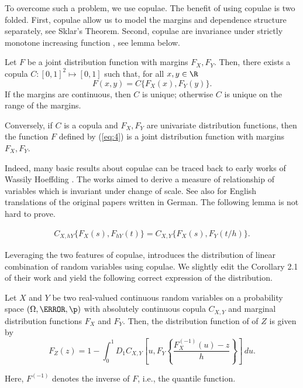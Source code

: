 To overcome such a problem, we use copulae.
The benefit of using copulae is two folded.
First, copulae allow us to model the margins and dependence structure separately, see Sklar's Theorem.
Second, copulae are invariance under strictly monotone increasing function \citep{schweizer1981nonparametric}, see lemma below.

\begin{theorem}
  Let $F$ be a joint distribution function with margins $F_X,
  F_Y$. Then, there exists a copula $C:[0,1]^2 \mapsto [0,1]$ such
  that, for all $x,y\in \R$
  \begin{equation}
    \label{eq:4}
    F(x,y)=C\{F_X(x), F_Y(y)\}.
  \end{equation}
  If the margins are continuous, then $C$ is unique; otherwise $C$ is
  unique on the range of the margins.

  Conversely, if $C$ is a copula and $F_X, F_Y$ are univariate
  distribution functions, then the function $F$ defined by (\ref{eq:4})
  is a joint distribution function with margins $F_X, F_Y$.
\end{theorem}

Indeed, many basic results about copulae can be traced back to early works of Wassily Hoeffding \citep{hoedffding1940, hoedffding1941}.
The works aimed to derive a measure of relationship of variables which is invariant under change of scale.
See also \citet{hoeffding2012collected} for English translations of the original papers written in German.
The following lemma is not hard to prove.

\begin{lemma}
  \begin{align}
  C_{X, hY}\{F_X(s),F_{hY}(t)\} = C_{X, Y}\{F_X(s),F_{Y}(t/h)\}.
    \end{align}
  \end{lemma}


Leveraging the two features of copulae, \citet{barbi2014copula} introduces the distribution of linear combination of random variables using copulae.
We slightly edit the Corollary 2.1 of their work and yield the following correct expression of the distribution.

\begin{proposition}
  \label{prop:dfrh}
  Let $X$ and $Y$ be two real-valued continuous random
  variables on a
  probability space $(\Omega, \F, \p)$ with
  absolutely continuous copula $C_{X, Y}$ and marginal distribution functions $F_{X}$
  and $F_{Y}$. Then, the distribution function of of $Z$ is given by 
  \begin{equation}
    \label{eq:3}
    F_{Z}(z) = 1- \int^1_0 D_1 C_{X, Y}
    \left[ u, F_{Y} \left\{ \frac{F^{(-1)}_{X}(u)-z}{h} \right\}
    \right]\, d u.
  \end{equation}
\end{proposition}
Here, $F^{(-1)}$ denotes the inverse of $F$, i.e., the quantile
function. \medskip

